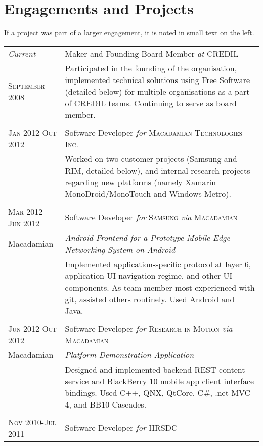 \documentclass[letterpaper,10pt]{article}
\begin{document}
\section{Engagements and Projects}
\footnotesize{If a project was part of a larger engagement, it is noted in small text on the left.}
\begin{longtable}{p{3cm}|p{12cm}}
  \emph{Current} & Maker and Founding Board Member \emph{at} \textsc{CREDIL} \\
  \textsc{September 2008} & \footnotesize{Participated in the founding of the organisation, implemented technical solutions using Free Software (detailed below) for multiple organisations as a part of CREDIL teams.  Continuing to serve as board member.} \\
\multicolumn{2}{c}{} \\
  \textsc{Jan 2012-Oct 2012} & Software Developer \emph{for} \textsc{Macadamian Technologies Inc.} \\
   & \footnotesize{Worked on two customer projects (Samsung and RIM, detailed below), and internal research projects regarding new platforms (namely Xamarin MonoDroid/MonoTouch and Windows Metro).} \\
\multicolumn{2}{c}{} \\
  \textsc{Mar 2012-Jun 2012} & Software Developer \emph{for} \textsc{Samsung} \emph{via} \textsc{Macadamian} \\
  \tiny{Macadamian} & \emph{Android Frontend for a Prototype Mobile Edge Networking System on Android} \\
   & \footnotesize{Implemented application-specific protocol at layer 6, application UI navigation regime, and other UI components.  As team member most experienced with git, assisted others routinely.  Used Android and Java.} \\
\multicolumn{2}{c}{} \\
  \textsc{Jun 2012-Oct 2012} & Software Developer \emph{for} \textsc{Research in Motion} \emph{via} \textsc{Macadamian} \\
  \tiny{Macadamian} & \emph{Platform Demonstration Application} \\
   & \footnotesize{Designed and implemented backend REST content service and BlackBerry 10 mobile app client interface bindings.  Used C++, QNX, QtCore, C\#, .net MVC 4, and BB10 Cascades.} \\
\pagebreak
\multicolumn{2}{c}{} \\
  \textsc{Nov 2010-Jul 2011} & Software Developer \emph{for} \textsc{HRSDC} \\

\end{longtable}
\end{document}
